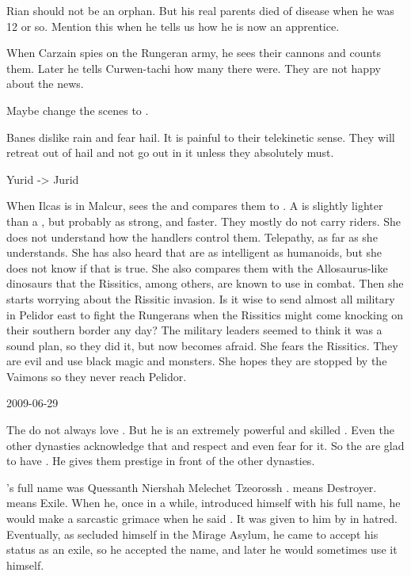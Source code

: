 Rian should not be an orphan.
But his real parents died of disease when he was 12 or so.
Mention this when he tells us how he is now an apprentice.

When Carzain spies on the Rungeran army, he sees their cannons and counts them.
Later he tells Curwen-tachi how many there were.
They are not happy about the news.

Maybe change the  scenes to .

Banes dislike rain and fear hail.
It is painful to their telekinetic sense.
They will retreat out of hail and not go out in it unless they absolutely must.

Yurid -> Jurid

When Ilcas is in Malcur, \Tiroco sees the \nycans and compares them to \grulcans.
A \nycan is slightly lighter than a \grulcan, but probably as strong, and faster.
They mostly do not carry riders.
She does not understand how the handlers control them.
Telepathy, as far as she understands.
She has also heard that \nycans are as intelligent as humanoids, but she does not know if that is true.
She also compares them with the Allosaurus-like dinosaurs that the Rissitics, among others, are known to use in combat.
Then she starts worrying about the Rissitic invasion.
Is it wise to send almost all military in Pelidor east to fight the Rungerans when the Rissitics might come knocking on their southern border any day?
The military leaders seemed to think it was a sound plan, so they did it, but now \Tiroco becomes afraid. 
She fears the Rissitics.
They are evil and use black magic and monsters.
She hopes they are stopped by the Vaimons so they never reach Pelidor.



2009-06-29

The \CiriathSepher do not always love \Azraid.
But he is an extremely powerful and skilled \sathariah. 
Even the other dynasties acknowledge that and respect and even fear \Azraid for it.
So the \CiriathSepher are glad to have \Azraid.
He gives them prestige in front of the other dynasties.

\Ishnaruchaefir's full name was Quessanth Niershah Melechet Tzeorossh \Ishnaruchaefir.
 means Destroyer.
 means Exile.
When he, once in a while, introduced himself with his full name, he would make a sarcastic grimace when he said .
It was given to him by \Secherdamon in hatred.
Eventually, as \Ishnaruchaefir secluded himself in the Mirage Asylum, he came to accept his status as an exile, so he accepted the name, and later he would sometimes use it himself.

